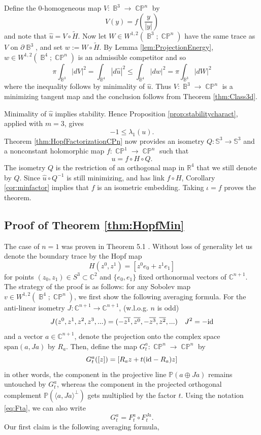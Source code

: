 \documentclass[11pt]{article}
\theoremstyle{plain}
\numberwithin{equation}{section}
\theoremstyle{definition}
\let\oldendproof\endproof
\renewenvironment{proof}[1][\proofname]{%
\oldproof[\upshape \bfseries #1]%
}{\oldendproof}
\def \R {\mathbb{R}}
\def \C{\mathbb{C}}
\def \mb{\mathbb}
\def \id{\textup{id}}
\DeclareMathOperator{\CP}{\mathbb{CP}}
\DeclareMathOperator{\B}{\mathbb{B}}
\begin{document}
\begin{proof}
    Define the $0$-homogeneous map $V\colon\B^3\to\CP^n$ by
    \[
        V(y)=f\left(\frac{y}{|y|}\right)
    \]
and note that   $\hat u=V\circ\widetilde H$. Now let  $W\in W^{1,2}(\B^3;\CP^n)$ have the same trace as
    $V$ on $\partial\B^3$, and set
    $w:=W\circ\widetilde H$.  By Lemma
    \ref{lem:ProjectionEnergy}, $w\in W^{1,2}(\B^4;\CP^n)$ is an admissible competitor and so
    \[
        \pi\int_{\B^3}|dV|^2
        =\int_{\B^4}|d\hat u|^2
        \leq\int_{\B^4}|dw|^2
        =\pi\int_{\B^3}|dW|^2
    \]
    where the inequality follows by minimality of $\hat u$.
    Thus $V\colon \B^3\to\CP^n$ is a minimizing tangent map
    and the conclusion follows from Theorem \ref{thm:Class3d}.
\end{proof}

\begin{proof}[Proof of Theorem \ref{thm:Class4d}]
    Minimality of $\hat u$ implies stability.  Hence Proposition
    \ref{prop:stabilitycharact}, applied with $m=3$, gives
    \[
        -1 \leq \lambda_1(u).
    \]
    Theorem \ref{thm:HopfFactorizationCPn} now provides an isometry
    $Q\colon\mb S^3\to\mb S^3$ and a nonconstant holomorphic map
    $f\colon\CP^1\to\CP^n$ such that
    \[
        u=f\circ H\circ Q.
    \]
    The isometry $Q$ is the restriction of an orthogonal map in $\R^4$ that
    we still denote by $Q$.  Since
    $\hat u\circ Q^{-1}$ is still minimizing, and has link $f\circ H$,
    Corollary \ref{cor:minfactor} implies that $f$ is an isometric
    embedding.  Taking $\iota=f$ proves the theorem.
\end{proof}

\subsection{Proof of Theorem \ref{thm:HopfMin}}
The case of $n=1$ was proven in Theorem 5.1 \cite{Coron1989}. Without loss of generality let us denote the boundary trace by the Hopf map
\[
    H(z^0,z^1)=[z^0e_0+z^1 e_1]
\]
for points $(z_0,z_1)\in S^3\subset\C^2$ and $\{e_0,e_1\}$ fixed orthonormal vectors of $\C^{n+1}$.
The strategy of the proof is as follows: for any Sobolev map $v\in W^{1,2}(\B^4;\CP^n)$, we first show the following averaging formula. For the anti-linear isometry $J:\C^{n+1}\to \C^{n+1}$, (w.l.o.g. $n$ is odd)
\[
    J(z^0, z^1, z^2,z^3,...)=(-\overline{z^1},\overline{z^0},-\overline{z^3},\overline{z^2},...)\quad J^2=-\id
\]
and a vector $a\in \C^{n+1}$, denote the projection onto the complex space $\text{span}(a,Ja)$ by $R_a$. Then, define the map $G_t^a:\CP^n\to\CP^n$ by
\[
    G_t^a([z])=[R_az+t(\id-R_a)z]
\]
in other words, the component in the projective line $\mathbb{P}(a\oplus Ja)$ remains untouched by $G_t^a$, whereas the component in the projected orthogonal complement $\mathbb{P}(\langle a,Ja\rangle^\perp)$ gets multiplied by the factor $t$. Using the notation \eqref{eq:Fta}, we can also write
\[
    G_t^a = F_t^a \circ F_t^{Ja}.
\]
Our first claim is the following averaging formula,
\medskip
\end{document}
